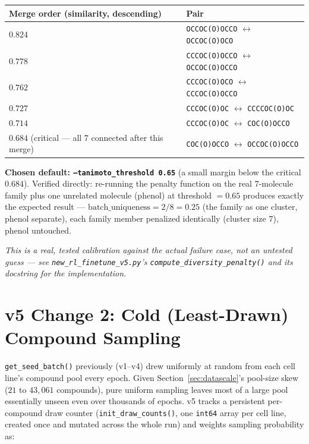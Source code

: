 \documentclass[11pt]{article}
\newcommand{\note}[1]{{\itshape\color{notegray}#1\par}}
\newcommand{\code}[1]{\texttt{#1}}
\begin{document}
\begin{center}
\begin{tabular}{@{}l l@{}}
\toprule
\textbf{Merge order (similarity, descending)} & \textbf{Pair} \\
\midrule
$0.824$ & \code{OCCOC(O)OCCO} $\leftrightarrow$ \code{OCCOC(O)OCO} \\
$0.778$ & \code{CCCOC(O)OCCO} $\leftrightarrow$ \code{OCCOC(O)OCCO} \\
$0.762$ & \code{CCCOC(O)OCO} $\leftrightarrow$ \code{CCCOC(O)OCCO} \\
$0.727$ & \code{CCCOC(O)OC} $\leftrightarrow$ \code{CCCCOC(O)OC} \\
$0.714$ & \code{CCCOC(O)OC} $\leftrightarrow$ \code{COC(O)OCCO} \\
$\mathbf{0.684}$ (critical --- all 7 connected after this merge) & \code{COC(O)OCCO} $\leftrightarrow$ \code{OCCOC(O)OCCO} \\
\bottomrule
\end{tabular}
\end{center}

\textbf{Chosen default: \code{--tanimoto\_threshold 0.65}} (a small margin below the critical $0.684$). Verified directly: re-running the penalty function on the real 7-molecule family plus one unrelated molecule (phenol) at threshold $=0.65$ produces exactly the expected result --- $\text{batch\_uniqueness} = 2/8 = 0.25$ (the family as one cluster, phenol separate), each family member penalized identically (cluster size $7$), phenol untouched.

\note{This is a real, tested calibration against the actual failure case, not an untested guess --- see \code{new\_rl\_finetune\_v5.py}'s \code{compute\_diversity\_penalty()} and its docstring for the implementation.}

\section{v5 Change 2: Cold (Least-Drawn) Compound Sampling}
\label{sec:cold}

\code{get\_seed\_batch()} previously (v1--v4) drew uniformly at random from each cell line's compound pool every epoch. Given Section~\ref{sec:datascale}'s pool-size skew ($21$ to $43{,}061$ compounds), pure uniform sampling leaves most of a large pool essentially unseen even over thousands of epochs. v5 tracks a persistent per-compound draw counter (\code{init\_draw\_counts()}, one \code{int64} array per cell line, created once and mutated across the whole run) and weights sampling probability as:
\end{document}

